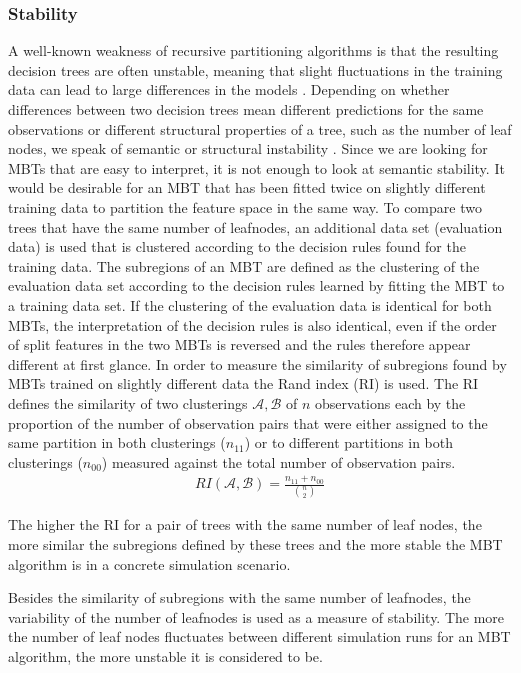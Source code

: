 \subsubsection{Stability}
A well-known weakness of recursive partitioning algorithms is that the resulting decision trees are often unstable, meaning that slight fluctuations in the training data can lead to large differences in the models \citep{Fokkema.2020}.
Depending on whether differences between two decision trees mean different predictions for the same observations or different structural properties of a tree, such as the number of leaf nodes, we speak of semantic or structural instability \citep{Wang.2018}. 
Since we are looking for MBTs that are easy to interpret, it is not enough to look at semantic stability. It would be desirable for an MBT that has been fitted twice on slightly different training data to partition the feature space in the same way. To compare two trees that have the same number of leafnodes, an additional data set (evaluation data) is used that is clustered according to the decision rules found for the training data. The subregions of an MBT are defined as the clustering of the evaluation data set according to the decision rules learned by fitting the MBT to a training data set. 
If the clustering of the evaluation data is identical for both MBTs, the interpretation of the decision rules is also identical, even if the order of split features in the two MBTs is reversed and the rules therefore appear different at first glance.
In order to measure the similarity of subregions found by MBTs trained on slightly different data the Rand index (RI) \citep{Rand.1971} is used. The RI defines the similarity of two clusterings $\mathcal{A}, \mathcal{B}$ of $n$ observations each by the proportion of  the number of observation pairs that were either assigned to the same partition in both clusterings ($n_{11}$) or to different partitions in both clusterings ($n_{00}$) measured against the total number of observation pairs. 
\begin{align}
    RI(\mathcal{A}, \mathcal{B}) = \frac{n_{11} + n_{00}}{\binom{n}{2}}
\end{align}
\citep{Gates.2017}

The higher the RI for a pair of trees with the same number of leaf nodes, the more similar the subregions defined by these trees and the more stable the MBT algorithm is in a concrete simulation scenario. 


Besides the similarity of subregions with the same number of leafnodes, the variability of the number of leafnodes is used as a measure of stability. The more the number of leaf nodes fluctuates between different simulation runs for an MBT algorithm, the more unstable it is considered 
 to be.

